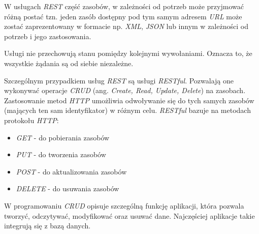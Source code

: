 W usługach \textsl{REST} część zasobów, w zależności od potrzeb może przyjmować różną postać tzn. jeden zasób dostępny pod tym samym adresem \textsl{URL} może zostać zaprezentowany w formacie np. \textsl{XML}, \textsl{JSON} lub innym w zależności od potrzeb i jego zastosowania.

Usługi nie przechowują stanu pomiędzy kolejnymi wywołaniami. Oznacza to, że wszystkie żądania są od siebie niezależne.

Szczególnym przypadkiem usług \textsl{REST} są usługi \textsl{RESTful}. Pozwalają one wykonywać operacje \textsl{CRUD} (ang. \textsl{Create, Read, Update, Delete}) na zasobach. Zastosowanie metod \textsl{HTTP} umożliwia odwoływanie się do tych samych zasobów (mających ten sam identyfikator) w różnym celu. \textsl{RESTful} bazuje na metodach protokołu \textsl{HTTP}:
\begin{itemize}
    \item \textsl{GET} - do pobierania zasobów
    \item \textsl{PUT} - do tworzenia zasobów
    \item \textsl{POST} - do aktualizowania zasobów
    \item \textsl{DELETE} - do usuwania zasobów
\end{itemize} 

W programowaniu \textsl{CRUD} opisuje szczególną funkcję aplikacji, która pozwala tworzyć, odczytywać, modyfikować oraz usuwać dane. Najczęściej aplikacje takie integrują się z bazą danych. 